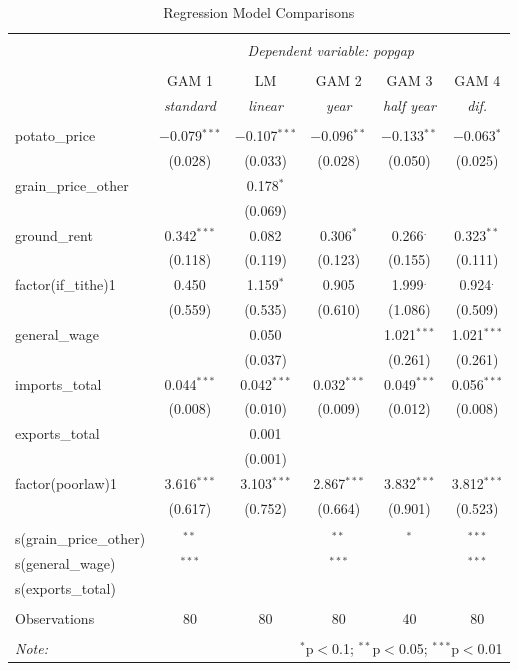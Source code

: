 \begin{table}[h]
    \centering
    \caption{Regression Model Comparisons}
    \begin{tabular}{@{\extracolsep{5pt}}lccccc}
    \\[-1.8ex]\hline
    \hline \\[-1.8ex]
    & \multicolumn{5}{c}{\textit{Dependent variable: popgap}} \\
    \cline{2-6}
    \\[-1.8ex] & GAM 1 & LM & GAM 2 & GAM 3 & GAM 4 \\
    & \textit{standard} & \textit{linear} & \textit{year} & \textit{half year} & \textit{dif.} \\
    \hline \\[-1.8ex]
    potato\_price & $-$0.079$^{***}$ & $-$0.107$^{***}$ & $-$0.096$^{**}$ & $-$0.133$^{**}$ & $-$0.063$^{*}$ \\
     & (0.028) & (0.033) & (0.028) & (0.050) & (0.025) \\
    grain\_price\_other & & 0.178$^{*}$ &  & & \\
     & & (0.069) &  & & \\
    ground\_rent & 0.342$^{***}$ & 0.082 & 0.306$^{*}$ & 0.266$^{.}$ & 0.323$^{**}$ \\
     & (0.118) & (0.119) & (0.123) & (0.155) & (0.111) \\
    factor(if\_tithe)1 & 0.450 & 1.159$^{*}$ & 0.905 & 1.999$^{.}$ & 0.924$^{.}$ \\
     & (0.559) & (0.535) & (0.610) & (1.086) & (0.509) \\
    general\_wage & & 0.050 & & 1.021$^{***}$ & 1.021$^{***}$ \\
     & & (0.037) & & (0.261) & (0.261) \\
    imports\_total & 0.044$^{***}$ & 0.042$^{***}$ & 0.032$^{***}$ & 0.049$^{***}$ & 0.056$^{***}$ \\
     & (0.008) & (0.010) & (0.009) & (0.012) & (0.008) \\
    exports\_total & & 0.001 & & & \\
     & & (0.001) & & & \\
    factor(poorlaw)1 & 3.616$^{***}$ & 3.103$^{***}$ & 2.867$^{***}$ & 3.832$^{***}$ & 3.812$^{***}$ \\
     & (0.617) & (0.752) & (0.664) & (0.901) & (0.523) \\
    \hline \\[-1.8ex]
    s(grain\_price\_other) & $^{**}$ & & $^{**}$ & $^{*}$ & $^{***}$  \\
    s(general\_wage) & $^{***}$ & & $^{***}$ & & $^{***}$ \\
    s(exports\_total) & & & \\
    \hline \\[-1.8ex]
    Observations & 80 & 80 & 80 & 40 & 80 \\
    \hline
    \hline \\[-1.8ex]
    \textit{Note:} & \multicolumn{5}{r}{$^{*}$p$<$0.1; $^{**}$p$<$0.05; $^{***}$p$<$0.01} \\
    \end{tabular}
\end{table}
